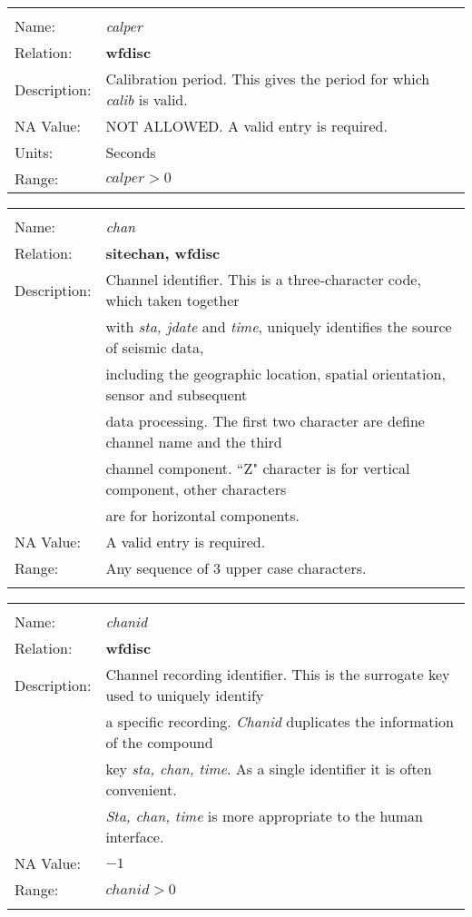 \begin{tabular*}{6.5 in}{ll} \hline
\\
Name: & {\it calper} \\
Relation: & {\bf wfdisc} \\
Description: & Calibration period. This gives the period for which {\it calib} is valid. \\ 
NA Value: & NOT ALLOWED. A valid entry is required. \\
Units: & Seconds \\
Range: & $calper > 0$ \\
\end{tabular*}
\begin{tabular*}{6.5 in}{ll} \hline
\\
Name: & {\it chan} \\
Relation: & {\bf sitechan, wfdisc} \\
Description: & Channel identifier. This is a three-character code, which taken together  \\
& with {\it sta, jdate} and {\it time}, uniquely identifies the source of seismic data, \\
& including the geographic location, spatial orientation, sensor and subsequent \\
& data processing. The first two character are define channel name and the third \\
& channel component. ``Z" character is for vertical component, other characters \\
& are for horizontal components. \\ 
NA Value: & A valid entry is required. \\
Range: & Any sequence of 3 upper case characters. \\
&\\
\end{tabular*}
\begin{tabular*}{6.5 in}{ll} \hline
\\
Name: & {\it chanid } \\
Relation: & {\bf wfdisc} \\
Description: & Channel recording identifier. This is the surrogate key used to uniquely identify  \\
& a specific recording. {\it Chanid }duplicates the information of the compound \\
& key {\it sta, chan, time}. As a single identifier it is often convenient. \\
& {\it Sta, chan, time} is more appropriate to the human interface. \\
NA Value: & $-1$ \\
Range: & $chanid > 0$ \\
&\\
\end{tabular*}
